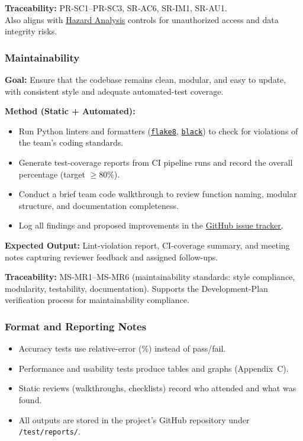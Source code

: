 \documentclass[12pt, titlepage]{article}
\begin{document}
\textbf{Traceability:} PR-SC1--PR-SC3, SR-AC6, SR-IM1, SR-AU1.\\
Also aligns with \href{https://github.com/thaafei/DomainX/blob/main/docs/HazardAnalysis/HazardAnalysis.pdf}{Hazard Analysis} controls for unauthorized access and data integrity risks.
\subsubsection{Maintainability}
\label{subsubsec:maintainability}

\textbf{Goal:} Ensure that the codebase remains clean, modular, and easy to update, with consistent style and adequate automated-test coverage.

\textbf{Method (Static + Automated):}
\begin{itemize}
  \item Run Python linters and formatters (\texttt{\href{https://flake8.pycqa.org/en/latest/}{flake8}}, \texttt{\href{https://github.com/psf/black}{black}}) to check for violations of the team’s coding standards.
  \item Generate test-coverage reports from CI pipeline runs and record the overall percentage (target \(\ge 80\%\)).
  \item Conduct a brief team code walkthrough to review function naming, modular structure, and documentation completeness.
  \item Log all findings and proposed improvements in the \href{https://github.com/thaafei/DomainX/issues}{GitHub issue tracker}.
\end{itemize}

\textbf{Expected Output:} Lint-violation report, CI-coverage summary, and meeting notes capturing reviewer feedback and assigned follow-ups.

\textbf{Traceability:} MS-MR1--MS-MR6 (maintainability standards: style compliance, modularity, testability, documentation). Supports the Development-Plan verification process for maintainability compliance.

\subsubsection*{Format and Reporting Notes}
\begin{itemize}
  \item Accuracy tests use relative-error (\%) instead of pass/fail.
  \item Performance and usability tests produce tables and graphs (Appendix~C).
  \item Static reviews (walkthroughs, checklists) record who attended and what was found.
  \item All outputs are stored in the project’s GitHub repository under \texttt{/test/reports/}.
\end{itemize}
\end{document}
